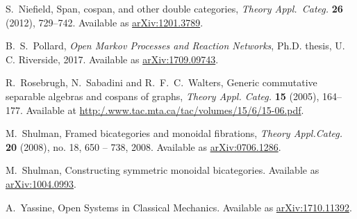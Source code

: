 \documentclass[reqno]{amsart}
\begin{document}
\begin{thebibliography}{100}
 S.~Niefield, Span, cospan, and other double categories, \textsl{Theory Appl.\ Categ.} \textbf{26} (2012), 729--742. Available as \href{https://arxiv.org/abs/1201.3789}{arXiv:1201.3789}.


 B.\ S.\ Pollard, \textsl{Open Markov Processes and Reaction Networks}, Ph.D. thesis, U. C. Riverside, 2017.  Available as \href{https://arxiv.org/abs/1709.09743}{arXiv:1709.09743}.

 R.\ Rosebrugh, N.\ Sabadini and R.\ F.\ C.\ Walters, Generic commutative separable algebras and cospans of graphs, \textsl{Theory Appl. Categ.} \textbf{15} (2005), 164--177. Available at \href{http:/.www.tac.mta.ca/tac/volumes/15/6/15-06.pdf}{http:/.www.tac.mta.ca/tac/volumes/15/6/15-06.pdf}.


 M.\ Shulman, Framed bicategories and monoidal fibrations, \emph{Theory Appl.Categ.} \textbf{20} (2008), no. 18, 650 -- 738, 2008. Available as \href{https://arxiv.org/abs/0706.1286}{arXiv:0706.1286}.

 M.\ Shulman, Constructing symmetric monoidal bicategories. Available as \href{http://arxiv.org/abs/1004.0993}{arXiv:1004.0993}.


 A.\ Yassine, Open Systems in Classical Mechanics. Available as \href{https://arxiv.org/abs/1710.11392}{arXiv:1710.11392}.

\end{thebibliography}
\end{document}
